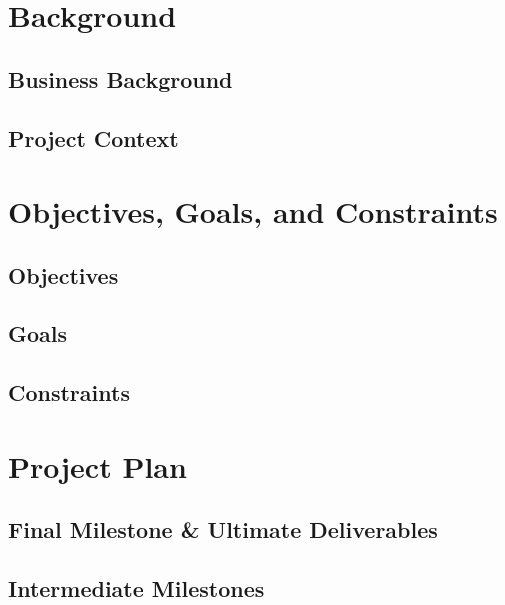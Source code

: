 \documentclass[10pt,letterpaper]{article}
\begin{document}
\section{Background}\label{section:background}


\subsection{Business Background}\label{section:businessbackground}


\subsection{Project Context}


\section{Objectives, Goals, and Constraints}\label{section:ocg}


\subsection{Objectives}


\subsection{Goals}


\subsection{Constraints}


\clearpage
\section{Project Plan}\label{section:project-plan}


\subsection{Final Milestone \& Ultimate Deliverables}\label{final_milestone}


\subsection{Intermediate Milestones}\label{intermediate_milestone}

\end{document}
